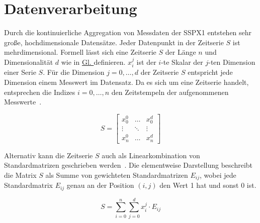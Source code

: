 \newpage
\section{Datenverarbeitung}
Durch die kontinuierliche Aggregation von Messdaten der SSPX1 entstehen sehr große, hochdimensionale Datensätze. Jeder Datenpunkt in
der Zeitserie $S$ ist mehrdimensional. Formell lässt sich eine Zeitserie $S$ der Länge $n$ und Dimensionalität $d$ wie in
\hyperref[eq:timeseries_matrix]{Gl. } definieren. $x_{i}^{j}$ ist der $i$-te Skalar der $j$-ten Dimension einer Serie $S$.
Für die Dimension $j={0,\dots,d}$ der Zeitserie $S$ entspricht jede Dimension einem Messwert im Datensatz. Da es sich um eine Zeitserie
handelt, entsprechen die Indizes $i={0, \dots, n}$ den Zeitstempeln der aufgenommenen Messwerte~\cite{Wenig2024}.

\begin{equation}
    S = \begin{bmatrix} 
        x_{0}^{0} & \hdots & x_{0}^{d} \\
        \vdots & \ddots & \vdots \\
        x_{n}^{0} & \hdots & x_{n}^{d} 
        \end{bmatrix}
\label{eq:timeseries_matrix}
\end{equation}

Alternativ kann die Zeitserie $S$ auch als Linearkombination von Standardmatrizen geschrieben werden~\cite{Voigt2012}. Die elementweise
Darstellung beschreibt die Matrix $S$ als Summe von gewichteten Standardmatrizen $E_{ij}$, wobei jede Standardmatrix $E_{ij}$ genau
an der Position $(i,j)$ den Wert 1 hat und sonst 0 ist.

\begin{equation}
    S=\sum_{i=0}^{n}\sum_{j=0}^{d}x_{i}^{j}\cdot E_{ij}
\end{equation}

